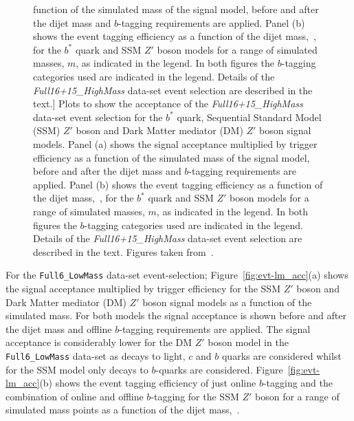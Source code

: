 \begin{figure}[!ht]
            function of the simulated mass of the signal model, before and after the
            dijet mass and $b$-tagging requirements are applied.
            Panel (b) shows the event tagging efficiency as a function of the dijet mass,~\mjj,
            for the $b^*$ quark and SSM $Z'$ boson models
            for a range of simulated masses, $m$, as indicated in the legend.
            In both figures the $b$-tagging categories used are indicated in the legend.
            Details of the \textit{Full16+15\_HighMass} data-set event selection are described in the text.]
          {Plots to show the acceptance of the \textit{Full16+15\_HighMass} data-set event selection for the $b^*$ quark,
            Sequential Standard Model (SSM) $Z'$ boson and Dark Matter mediator (DM) $Z'$ boson signal models.
            Panel (a) shows the signal acceptance multiplied by trigger efficiency as a
            function of the simulated mass of the signal model, before and after the
            dijet mass and $b$-tagging requirements are applied.
            Panel (b) shows the event tagging efficiency as a function of the dijet mass,~\mjj,
            for the $b^*$ quark and SSM $Z'$ boson models
            for a range of simulated masses, $m$, as indicated in the legend.
            In both figures the $b$-tagging categories used are indicated in the legend.
            Details of the \textit{Full16+15\_HighMass} data-set event selection are described in the text.
            Figures taken from~\cite{dibjet-full_int}.} 
  \label{fig:evt-hm_acc}
\end{figure}

For the \verb|Full6_LowMass| data-set event-selection;
Figure~\ref{fig:evt-lm_acc}(a) shows the signal acceptance multiplied by trigger efficiency
for the SSM $Z'$ boson and Dark Matter mediator (DM) $Z'$ boson signal models as a function of the simulated mass.
For both models the signal acceptance is shown before and after the
dijet mass and offline $b$-tagging requirements are applied.
The signal acceptance is considerably lower for the DM $Z'$ boson model in the \verb|Full6_LowMass| data-set
as decays to light, $c$ and $b$ quarks are considered
whilst for the SSM model only decays to $b$-quarks are considered.
Figure~\ref{fig:evt-lm_acc}(b) shows the event tagging efficiency
of just online $b$-tagging and the combination of online and offline $b$-tagging
for the SSM $Z'$ boson for a range of simulated mass points
as a function of the dijet mass,~\mjj.

